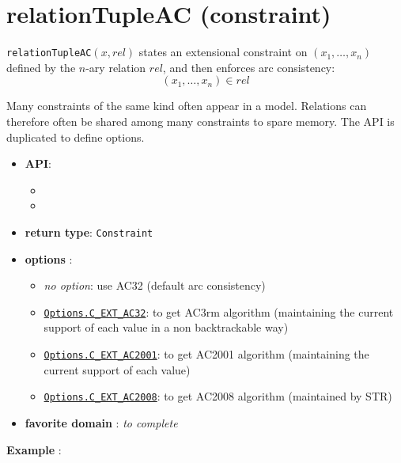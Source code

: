 \label{relationtupleac}
\hypertarget{relationtupleac}{}

\section{relationTupleAC (constraint)}\label{relationtupleac:relationtupleacconstraint}\hypertarget{relationtupleac:relationtupleacconstraint}{}
\begin{notedef}
  \texttt{relationTupleAC}$(x,rel)$ states an extensional constraint on $(x_1,\ldots,x_n)$ defined by the $n$-ary relation $rel$, and then enforces arc consistency:
$$(x_1,\ldots,x_n)\in rel$$
\end{notedef}
Many constraints of the same kind often appear in a model. Relations can therefore often be shared among many constraints to spare memory.
The API is duplicated to define options.

\begin{itemize}
	\item \textbf{API}:
	\begin{itemize}
		\item {}
		\item {}
	\end{itemize}
	\item \textbf{return type}: \texttt{Constraint}
	\item \textbf{options} :
	\begin{itemize}
		\item \emph{no option}: use AC32 (default arc consistency)
		\item \hyperlink{cext32:cext32options}{\tt Options.C\_EXT\_AC32}: to get AC3rm algorithm (maintaining the current support of each value in a non backtrackable way)
		\item \hyperlink{cext2001:cext2001options}{\tt Options.C\_EXT\_AC2001}: to get AC2001 algorithm (maintaining the current support of each value)
		\item \hyperlink{cext2008:cext2008options}{\tt Options.C\_EXT\_AC2008}: to get AC2008 algorithm (maintained by STR)
	\end{itemize}
	\item \textbf{favorite domain} : \emph{to complete}
\end{itemize}

\textbf{Example} :

